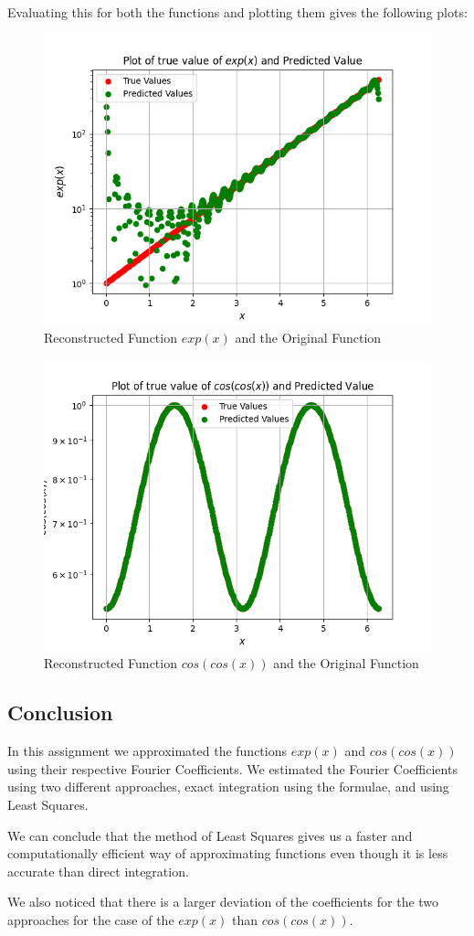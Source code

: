 \documentclass{article}
\begin{document}
Evaluating this for both the functions and plotting them gives the following plots:
\begin{figure}[h]
    \centering
    \includegraphics[scale = 0.4]{Figure_11.png}
    \caption{Reconstructed Function $exp(x)$ and the Original Function}
    \label{fig:my_label}
\end{figure}
\begin{figure}
    \centering
    \includegraphics[scale = 0.4]{Figure_12.png}
    \caption{Reconstructed Function $cos(cos(x))$ and the Original Function}
    \label{fig:my_label}
\end{figure}

\subsection{Conclusion}
In this assignment we approximated the functions $exp(x)$ and $cos(cos(x))$ using their respective Fourier Coefficients. We estimated the Fourier Coefficients using two different approaches, exact integration using the formulae, and using Least Squares.

We can conclude that the method of Least Squares gives us a faster and computationally efficient way of approximating functions even though it is less accurate than direct integration.

We also noticed that there is a larger deviation of the coefficients for the two approaches for the case of the $exp(x)$ than $cos(cos(x))$.
\end{document}
